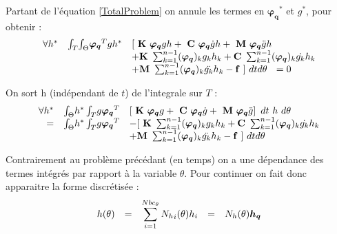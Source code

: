 \documentclass[12pt,a4paper]{report}
\begin{document}
  
Partant de l'équation \ref{TotalProblem} on annule les termes en $\boldsymbol{\varphi_q}^*$ et $g^*$, pour obtenir :
  \begin{equation}
\begin{array}{r r l}
	\forall h^*
	&\int_T \! \int_\Theta \!  \boldsymbol{\varphi_q}^Tgh^* &
						[  ~\mathbf{K}~ \boldsymbol{\varphi_q}gh
						+ ~\mathbf{C}~ \boldsymbol{\varphi_q} \dot{g}h 
						+ ~\mathbf{M}~ \boldsymbol{\varphi_q} \ddot{g}h
	\\ &&
	  		+ \mathbf{K}~ \sum_{k=1}^{n-1} (\boldsymbol{\varphi_q})_k       g_k  h_k 
			+ \mathbf{C}~ \sum_{k=1}^{n-1} (\boldsymbol{\varphi_q})_k  \dot{g_k} h_k 
	\\ &&
			+ \mathbf{M}~ \sum_{k=1}^{n-1} (\boldsymbol{\varphi_q})_k \ddot{g_k} h_k
			-\mathbf{f}~] ~dt d\theta ~~=0
\end{array}
\end{equation}

On sort h (indépendant de $t$) de l'integrale sur $T$ :  
\begin{equation}
\begin{array}{r r l}
	\forall h^*
	&\int_\Theta \!  h^* \int_T \! g \boldsymbol{\varphi_q}^T &
						\left[  ~\mathbf{K}~ \boldsymbol{\varphi_q}g
							+ ~\mathbf{C}~ \boldsymbol{\varphi_q} \dot{g}
							+ ~\mathbf{M}~ \boldsymbol{\varphi_q} \ddot{g}
						\right]~dt ~ h ~d\theta
	\\ = &\int_\Theta \!  h^* \int_T \! g \boldsymbol{\varphi_q}^T &
	  		-[~ \mathbf{K}~ \sum_{k=1}^{n-1} (\boldsymbol{\varphi_q})_k       g_k  h_k 
			+ \mathbf{C}~ \sum_{k=1}^{n-1} (\boldsymbol{\varphi_q})_k  \dot{g_k} h_k 
	\\ &&
			+ \mathbf{M}~ \sum_{k=1}^{n-1} (\boldsymbol{\varphi_q})_k \ddot{g_k} h_k
			-\mathbf{f}~] ~dt d\theta 
\end{array}
\end{equation}

Contrairement au problème précédant (en temps) on a une dépendance des termes intégrés par rapport à la variable $\theta$. Pour continuer on fait donc apparaitre la forme discrétisée :
\begin{equation}
	\begin{array}{l c l c l}
		h(\theta) &=& \displaystyle \sum_{i=1}^{Nbc_\theta}  {N_h}_i (\theta) h_i &=& N_h(\theta) \boldsymbol{h_q} \\
	\end{array}
\end{equation}
\end{document}
